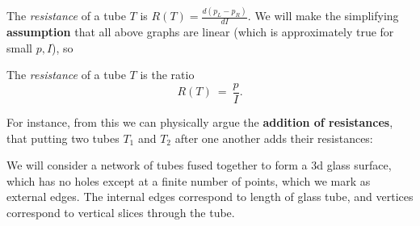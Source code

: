 \documentclass[11pt,fleqn]{book} %
\begin{document}
The \emph{resistance} of a tube $T$ is $R(T) = \frac{d(p_L-p_R)}{dI}$. We will make the simplifying \textbf{assumption} that all above graphs are linear (which is approximately true for small $p,I$), so

 \begin{definition}
   The \emph{resistance} of a tube $T$ is the ratio
   $$R(T) \ = \ \frac{p}{I}.$$
 \end{definition}


For instance, from this we can physically argue the \textbf{addition of resistances}, that putting two tubes $T_1$ and $T_2$ after one another adds their resistances:
\begin{center}
 \end{center}





We will consider a network of tubes fused together to form a 3d glass surface, which has no holes except at a finite number of points, which we mark as external edges. The internal edges correspond to length of glass tube, and vertices correspond to vertical slices through the tube. 
\end{document}
